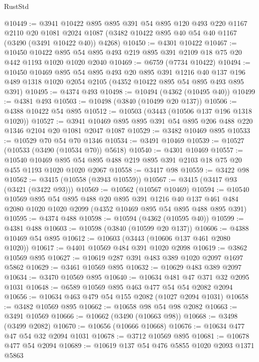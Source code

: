 \begin{lexlean}{RustStd}
\begin{coremodule}
{\begin{coremodule}
{{{{{{{{{{{{{{{{{{{{{{{{{{@10449 := @3941
    @10422
    @895
    @895
    @391
    @54
    @895
    @120
    @493
    @220
    @1167
    @2110
    @20
    @1081
    @2024
    @1087
    (@3482 @10422 @895 @40 @54 @40 @1167 (@3490 (@3491 @10422 @40)) @4268)
@10450 := @4301 @10422
@10467 := @10450
    @10422
    @895
    @54
    @895
    @493
    @219
    @895
    @391
    @2109
    @18
    @75
    @20
    @442
    @1193
    @1020
    @1020
    @2040
@10469 := @6759 (@7734 @10422)
@10494 := @10450
    @10469
    @895
    @54
    @895
    @493
    @20
    @895
    @391
    @1216
    @40
    @137
    @196
    @489
    @1318
    @1020
    @2054
    @2105
    (@4352 @10422 @895 @54 @895 @493 @895 @391)
@10495 := @4374 @493
@10498 := @10494 (@4362 (@10495 @40))
@10499 := @4381 @493
@10503 := @10498 (@3840 (@10499 @20 @137))
@10506 := @4388 @10422 @54 @895
@10512 := @10503 (@3443 (@10506 @137 @196 @1318 @1020))
@10527 := @3941 @10469 @895 @895 @391 @54 @895 @206 @488 @220 @1346 @2104 @20 @1081 @2047 @1087
@10529 := @3482 @10469 @895
@10533 := @10529 @70 @54 @70 @1346
@10534 := @3491 @10469
@10539 := @10527 (@10533 (@3490 (@10534 @70)) @5618)
@10540 := @4301 @10469
@10557 := @10540
    @10469
    @895
    @54
    @895
    @488
    @219
    @895
    @391
    @2103
    @18
    @75
    @20
    @455
    @1193
    @1020
    @1020
    @2067
@10558 := @3417 @98
@10559 := @3422 @98
@10562 := @3415 (@10558 (@3943 @10559))
@10567 := @3415 (@3417 @93 (@3421 (@3422 @93)))
@10569 := @10562 (@10567 @10469)
@10594 := @10540
    @10569
    @895
    @54
    @895
    @488
    @20
    @895
    @391
    @1216
    @40
    @137
    @461
    @484
    @2080
    @1020
    @1020
    @2099
    (@4352 @10469 @895 @54 @895 @488 @895 @391)
@10595 := @4374 @488
@10598 := @10594 (@4362 (@10595 @40))
@10599 := @4381 @488
@10603 := @10598 (@3840 (@10599 @20 @137))
@10606 := @4388 @10469 @54 @895
@10612 := @10603 (@3443 (@10606 @137 @461 @2080 @1020))
@10617 := @4401 @10569 @484 @391 @1020 @2098
@10619 := @3862 @10569 @895
@10627 := @10619 @287 @391 @483 @389 @1020 @2097 @1697 @5862
@10629 := @3461 @10569 @895
@10632 := @10629 @483 @389 @2097
@10634 := @3470 @10569 @895
@10640 := @10634 @481 @47 @371 @32 @2095 @1031
@10648 := @6589 @10569 @895 @463 @477 @54 @54 @2082 @2094
@10656 := @10634 @463 @479 @54 @155 @2082 (@1027 @2094 @1031)
@10658 := @3482 @10569 @895
@10662 := @10658 @98 @54 @98 @2082
@10663 := @3491 @10569
@10666 := @10662 (@3490 (@10663 @98))
@10668 := @3498 (@3499 @2082)
@10670 := @10656 (@10666 @10668)
@10676 := @10634 @477 @47 @54 @32 @2094 @1031
@10678 := @3712 @10569 @895
@10681 := @10678 @477 @54 @2094
@10689 := @10619 @137 @54 @476 @5855 @1020 @2093 @1371 @5863
}}}}}}}}}}}}}}}}}}}}}}}}}}
\end{coremodule}}
\end{coremodule}
\end{lexlean}
